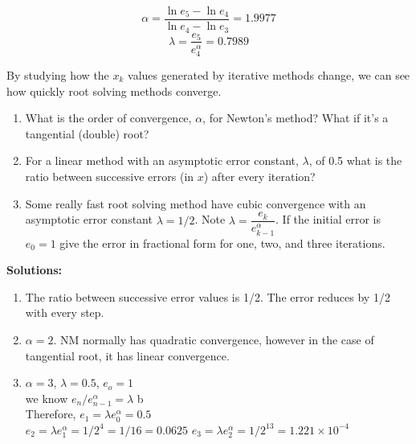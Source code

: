 \documentclass[12pt]{article}
\begin{document}
\begin{description}
\begin{enumerate} [label=(\alph*)]
			\begin{equation*}
			\alpha= \frac{\ln e_{5}-\ln e_4}{\ln e_4 - \ln e_{3}} = 1.9977
			\end{equation*}
			\begin{equation*}
			\lambda= \dfrac{e_5}{e_{4}^\alpha} = 0.7989
			\end{equation*}
			
		\end{enumerate}
		\color{black}
		\fi
		
		\item[6. Order/Rate of Convergence (10 pts) By-hand.] By studying how the $x_k$ values generated by iterative methods change, we can see how quickly root solving methods converge.
		\begin{enumerate} [label=(\alph*)]
			\item What is the order of convergence, $\alpha$, for Newton's method? What if it's a tangential (double) root?
			
			\item For a linear method with an asymptotic error constant, $\lambda$, of 0.5 what is the ratio between successive errors (in $x$) after every iteration?
			
			\item Some really fast root solving method have cubic convergence with an asymptotic error constant $\lambda = 1/2$. Note $\lambda = \dfrac{e_k}{e_{k-1}^\alpha}$. If the initial error is $e_0 = 1$ give the error in fractional form for one, two, and three iterations.
		\end{enumerate}
		
		\ifsolution
		\color{red}
		{\bf Solutions:}  \\
		\begin{enumerate}[label=\alph*.]
			\item The ratio between successive error values is 1/2. The error reduces by 1/2 with every step.
			\item $\alpha = 2$. NM normally has quadratic convergence, however in the case of tangential root, it has linear convergence.
			\item $\alpha = 3$, $\lambda = 0.5$, $e_o =1$ \\
			we know $e_n/e_{n-1}^\alpha = \lambda$ b \\
			Therefore, $e_1 = \lambda e_{0}^\alpha = 0.5$ \\
			$e_2 = \lambda e_{1}^\alpha = 1/2^4 = 1/16 = 0.0625$ 
			$e_3 = \lambda e_{2}^\alpha = 1/2^13 = 1.221 \times  10^{-4}$ 
			

\end{enumerate}
\end{description}
\end{document}
